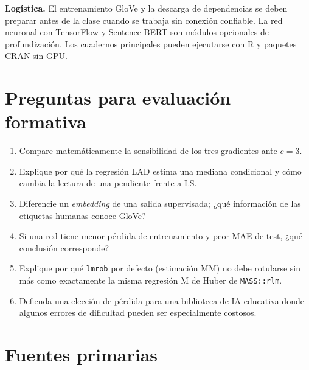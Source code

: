 \documentclass[11pt,a4paper]{article}
\begin{document}
\begin{cuidado}
\textbf{Logística.} El entrenamiento GloVe y la descarga de dependencias se deben preparar antes de la clase cuando se trabaja sin conexión confiable. La red neuronal con TensorFlow y Sentence-BERT son módulos opcionales de profundización. Los cuadernos principales pueden ejecutarse con R y paquetes CRAN sin GPU.
\end{cuidado}

\section{Preguntas para evaluación formativa}

\begin{enumerate}
 \item Compare matemáticamente la sensibilidad de los tres gradientes ante \(e=3\).
 \item Explique por qué la regresión LAD estima una mediana condicional y cómo cambia la lectura de una pendiente frente a LS.
 \item Diferencie un \emph{embedding} de una salida supervisada; ¿qué información de las etiquetas humanas conoce GloVe?
 \item Si una red tiene menor pérdida de entrenamiento y peor MAE de test, ¿qué conclusión corresponde?
 \item Explique por qué \texttt{lmrob} por defecto (estimación MM) no debe rotularse sin más como exactamente la misma regresión M de Huber de \texttt{MASS::rlm}.
 \item Defienda una elección de pérdida para una biblioteca de IA educativa donde algunos errores de dificultad pueden ser especialmente costosos.
\end{enumerate}

\section{Fuentes primarias}
\end{document}
